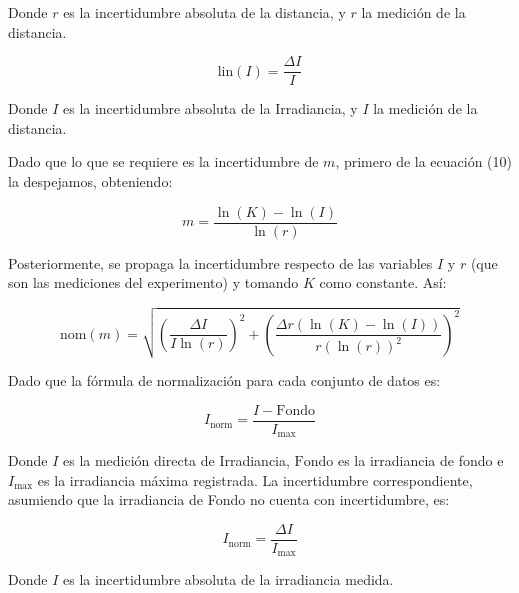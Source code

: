 \documentclass[article,12pt]{elsarticle}
\begin{document}
Donde $r$ es la incertidumbre absoluta de la distancia, y $r$ la medición de la distancia.
\begin{mdframed}
\begin{equation}
    \text{lin}(I) = \frac{\Delta I}{I}
\end{equation}
\end{mdframed}

Donde $I$ es la incertidumbre absoluta de la Irradiancia, y $I$ la medición de la distancia.


Dado que lo que se requiere es la incertidumbre de $m$, primero de la ecuación (10) la despejamos, obteniendo:

\begin{mdframed}
\begin{equation}
    m = \frac{\ln(K) - \ln(I)}{\ln(r)}
\end{equation}
\end{mdframed}

Posteriormente, se propaga la incertidumbre respecto de las variables $I$ y $r$ (que son las mediciones del experimento) y tomando $K$ como constante. Así:

\begin{mdframed}
\begin{equation}
    \text{nom}(m) = \sqrt{\left(\frac{\Delta I}{I \ln(r)}\right)^2 + \left(\frac{\Delta r( \ln(K)-\ln(I))}{r (\ln(r))^2}\right)^2}
\end{equation}
\end{mdframed}

Dado que la fórmula de normalización para cada conjunto de datos es:

\begin{mdframed}
\begin{equation}
    I_{\text{norm}} = \frac{I - \text{Fondo}}{I_{\text{max}}}
\end{equation}
\end{mdframed}

Donde $I$ es la medición directa de Irradiancia, $\text{Fondo}$ es la irradiancia de fondo e $I_{\text{max}}$ es la irradiancia máxima registrada. La incertidumbre correspondiente, asumiendo que la irradiancia de Fondo no cuenta con incertidumbre, es:

\begin{mdframed}
\begin{equation}
    I_{\text{norm}} = \frac{\Delta I}{I_{\text{max}}}
\end{equation}
\end{mdframed}

Donde $I$ es la incertidumbre absoluta de la irradiancia medida.
\end{document}
